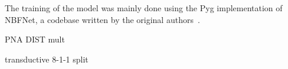 The training of the model was mainly done using the Pyg implementation of NBFNet, a codebase written by the original authors~\cite{NBFNet_PyG}.

PNA DIST mult

transductive 8-1-1 split